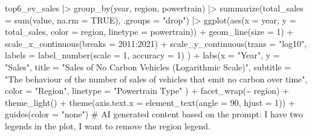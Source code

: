 \documentclass[
  11pt,
  a4paper,
  DIV=11,
  numbers=noendperiod]{scrartcl}
\newenvironment{Shaded}{\begin{snugshade}}{\end{snugshade}}
\newcommand{\AttributeTok}[1]{\textcolor[rgb]{0.40,0.45,0.13}{#1}}
\newcommand{\CommentTok}[1]{\textcolor[rgb]{0.37,0.37,0.37}{#1}}
\newcommand{\ConstantTok}[1]{\textcolor[rgb]{0.56,0.35,0.01}{#1}}
\newcommand{\DecValTok}[1]{\textcolor[rgb]{0.68,0.00,0.00}{#1}}
\newcommand{\FunctionTok}[1]{\textcolor[rgb]{0.28,0.35,0.67}{#1}}
\newcommand{\NormalTok}[1]{\textcolor[rgb]{0.00,0.23,0.31}{#1}}
\newcommand{\SpecialCharTok}[1]{\textcolor[rgb]{0.37,0.37,0.37}{#1}}
\newcommand{\StringTok}[1]{\textcolor[rgb]{0.13,0.47,0.30}{#1}}
\begin{document}
\begin{Shaded}
\begin{Highlighting}[]
\NormalTok{top6\_ev\_sales }\SpecialCharTok{|\textgreater{}} \FunctionTok{group\_by}\NormalTok{(year, region, powertrain) }\SpecialCharTok{|\textgreater{}}
  \FunctionTok{summarize}\NormalTok{(}\AttributeTok{total\_sales =} \FunctionTok{sum}\NormalTok{(value, }\AttributeTok{na.rm =} \ConstantTok{TRUE}\NormalTok{), }\AttributeTok{.groups =} \StringTok{"drop"}\NormalTok{) }\SpecialCharTok{|\textgreater{}}
  \FunctionTok{ggplot}\NormalTok{(}\FunctionTok{aes}\NormalTok{(}\AttributeTok{x =}\NormalTok{ year, }\AttributeTok{y =}\NormalTok{ total\_sales, }\AttributeTok{color =}\NormalTok{ region, }\AttributeTok{linetype =}\NormalTok{ powertrain)) }\SpecialCharTok{+}
  \FunctionTok{geom\_line}\NormalTok{(}\AttributeTok{size =} \DecValTok{1}\NormalTok{) }\SpecialCharTok{+}
  \FunctionTok{scale\_x\_continuous}\NormalTok{(}\AttributeTok{breaks =} \DecValTok{2011}\SpecialCharTok{:}\DecValTok{2021}\NormalTok{) }\SpecialCharTok{+}
  \FunctionTok{scale\_y\_continuous}\NormalTok{(}\AttributeTok{trans =} \StringTok{"log10"}\NormalTok{,}
                     \AttributeTok{labels =} \FunctionTok{label\_number}\NormalTok{(}\AttributeTok{scale =} \DecValTok{1}\NormalTok{, }\AttributeTok{accuracy =} \DecValTok{1}\NormalTok{)}
\NormalTok{                     ) }\SpecialCharTok{+}
  \FunctionTok{labs}\NormalTok{(}\AttributeTok{x =} \StringTok{"Year"}\NormalTok{,}
       \AttributeTok{y =} \StringTok{"Sales"}\NormalTok{,}
       \AttributeTok{title =} \StringTok{"Sales of No Carbon Vehicles (Logarithmic Scale)"}\NormalTok{,}
       \AttributeTok{subtitle =} \StringTok{"The behaviour of the number of sales of vehicles that emit no carbon over time"}\NormalTok{,}
       \AttributeTok{color =} \StringTok{"Region"}\NormalTok{,}
       \AttributeTok{linetype =} \StringTok{"Powertrain Type"}
\NormalTok{  ) }\SpecialCharTok{+}
  \FunctionTok{facet\_wrap}\NormalTok{(}\SpecialCharTok{\textasciitilde{}}\NormalTok{ region) }\SpecialCharTok{+}
  \FunctionTok{theme\_light}\NormalTok{() }\SpecialCharTok{+}
  \FunctionTok{theme}\NormalTok{(}\AttributeTok{axis.text.x =} \FunctionTok{element\_text}\NormalTok{(}\AttributeTok{angle =} \DecValTok{90}\NormalTok{, }\AttributeTok{hjust =} \DecValTok{1}\NormalTok{)) }\SpecialCharTok{+}
  \FunctionTok{guides}\NormalTok{(}\AttributeTok{color =} \StringTok{"none"}\NormalTok{) }\CommentTok{\# AI generated content based on the prompt: I have two legends in the plot, I want to remove the region legend.}
\end{Highlighting}
\end{Shaded}
\end{document}
